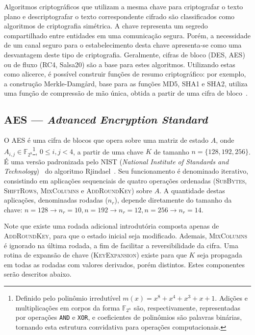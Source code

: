\documentclass[12pt]{report}
\begin{document}
Algoritmos criptográficos que utilizam a mesma chave para criptografar o
texto plano e descriptografar o texto correspondente cifrado são classificados
como algoritmos de criptografia simétrica. A chave representa um segredo
compartilhado entre entidades em uma comunicação segura. Porém, a necessidade
de um canal seguro para o estabelecimento desta chave apresenta-se como uma
desvantagem deste tipo de criptografia. Geralmente, cifras de bloco (DES, AES)
ou de fluxo (RC4, Salsa20) são a base para estes algoritmos. Utilizando estas
como alicerce, é possível construir funções de resumo criptográfico: por
exemplo, a construção Merkle-Damgård, base para as funções MD5, SHA1 e SHA2,
utiliza uma função de compressão de mão única, obtida a partir de uma cifra de
bloco~\cite[9.41]{Menezes:1996:HAC:548089}.

\subsection{AES --- \emph{Advanced Encryption Standard}}

O AES é uma cifra de blocos que opera sobre uma matriz de estado $A$, onde $A_{i,j} \in \mathbb{F}_{2^{8}}$\footnote{Definido pelo polinômio irredutível $m(x) = x^{8} + x^{4} + x^{3} + x + 1$. Adições e multiplicações em corpos da forma $\mathbb{F}_{2^n}$ são, respectivamente, representadas por operações \texttt{AND} e \texttt{XOR}, e coeficientes de polinômios são palavras binárias, tornando esta estrutura convidativa para operações computacionais.}, $0 \leq i, j < 4$, a partir de uma chave $K$ de tamanho $n = \{128, 192, 256\}$. É uma versão padronizada pelo NIST (\emph{National Institute of Standards and Technology})~\cite{Standards2001} do algoritmo Rjindael~\cite{Daemen:2002:DR:560131}. Seu funcionamento é denominado iterativo, consistindo em aplicações sequenciais de quatro operações ordenadas (\textsc{SubBytes}, \textsc{ShiftRows}, \textsc{MixColumns} e \textsc{AddRoundKey}) sobre $A$. A quantidade destas aplicações, denominadas rodadas ($n_r$), depende diretamente do tamanho da chave: $n = 128 \rightarrow n_r = 10, n = 192 \rightarrow n_r = 12, n = 256 \rightarrow n_r = 14$.

Note que existe uma rodada adicional introdutória composta apenas de \textsc{AddRoundKey}, para que o estado inicial seja modificado. Ademais, \textsc{MixColumns} é ignorado na última rodada, a fim de facilitar a reversibilidade da cifra. Uma rotina de expansão de chave (\textsc{KeyExpansion}) existe para que $K$ seja propagada em todas as rodadas com valores derivados, porém distintos. Estes componentes serão descritos abaixo.
\end{document}
